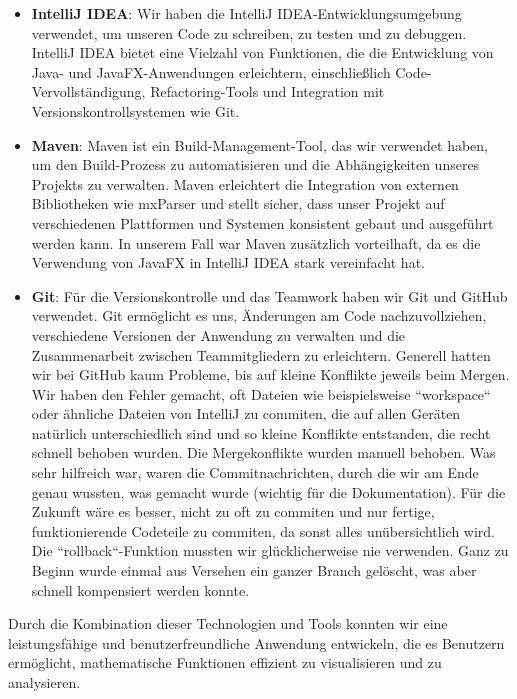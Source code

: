 \documentclass[a4paper]{article}
\begin{document}
\begin{itemize}
	\item \textbf{IntelliJ IDEA}: Wir haben die IntelliJ IDEA-Entwicklungsumgebung verwendet, um unseren Code zu schreiben, zu testen und zu debuggen. IntelliJ IDEA bietet eine Vielzahl von Funktionen, die die Entwicklung von Java- und JavaFX-Anwendungen erleichtern, einschließlich Code-Vervollständigung, Refactoring-Tools und Integration mit Versionskontrollsystemen wie Git.

	\item \textbf{Maven}: Maven ist ein Build-Management-Tool, das wir verwendet haben, um den Build-Prozess zu automatisieren und die Abhängigkeiten unseres Projekts zu verwalten. Maven erleichtert die Integration von externen Bibliotheken wie mxParser und stellt sicher, dass unser Projekt auf verschiedenen Plattformen und Systemen konsistent gebaut und ausgeführt werden kann. In unserem Fall war Maven zusätzlich vorteilhaft, da es die Verwendung von JavaFX in IntelliJ IDEA stark vereinfacht hat.

	\item \textbf{Git}: Für die Versionskontrolle und das Teamwork haben wir Git und GitHub verwendet. Git ermöglicht es uns, Änderungen am Code nachzuvollziehen, verschiedene Versionen der Anwendung zu verwalten und die Zusammenarbeit zwischen Teammitgliedern zu erleichtern. Generell hatten wir bei GitHub kaum Probleme, bis auf kleine Konflikte jeweils beim Mergen. Wir haben den Fehler gemacht, oft Dateien wie beispielsweise ``workspace`` oder ähnliche Dateien von IntelliJ zu commiten, die auf allen Geräten natürlich unterschiedlich sind und so kleine Konflikte entstanden, die recht schnell behoben wurden. Die Mergekonflikte wurden manuell behoben. Was sehr hilfreich war, waren die Commitnachrichten, durch die wir am Ende genau wussten, was gemacht wurde (wichtig für die Dokumentation). Für die Zukunft wäre es besser, nicht zu oft zu commiten und nur fertige, funktionierende Codeteile zu commiten, da sonst alles unübersichtlich wird. Die ``rollback``-Funktion mussten wir glücklicherweise nie verwenden. Ganz zu Beginn wurde einmal aus Versehen ein ganzer Branch gelöscht, was aber schnell kompensiert werden konnte.
\end{itemize}


Durch die Kombination dieser Technologien und Tools konnten wir eine leistungsfähige und benutzerfreundliche Anwendung entwickeln, die es Benutzern ermöglicht, mathematische Funktionen effizient zu visualisieren und zu analysieren.
\end{document}

